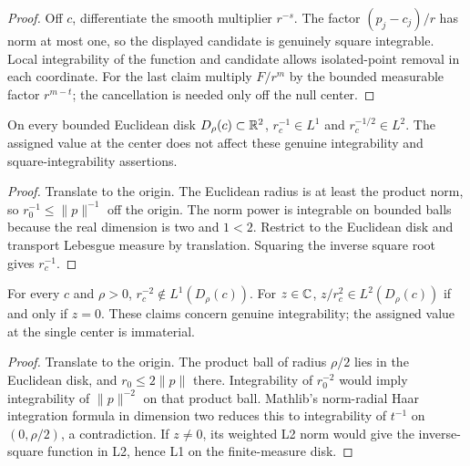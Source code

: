 \begin{proof}
\leanok
Off $c$, differentiate the smooth multiplier $r^{-s}$.
The factor $(p_j-c_j)/r$ has norm at most one, so the displayed candidate
is genuinely square integrable. Local integrability of the function and
candidate allows isolated-point removal in each coordinate.
For the last claim multiply $F/r^m$ by the bounded measurable factor
$r^{m-t}$; the cancellation is needed only off the null center.
\end{proof}

\begin{lemma}
\label{lem:inverse-radius-mass}
\leanok
On every bounded Euclidean disk $D_\rho(c)\subset\mathbb{R}^2$,
$r_c^{-1}\in L^1$ and $r_c^{-1/2}\in L^2$.
The assigned value at the center does not affect these genuine integrability
and square-integrability assertions.
\end{lemma}

\begin{proof}
\leanok
Translate to the origin. The Euclidean radius is at least the product
norm, so $r_0^{-1}\le\|p\|^{-1}$ off the origin.
The norm power is integrable on bounded balls because the real dimension
is two and $1<2$. Restrict to the Euclidean disk and transport Lebesgue
measure by translation. Squaring the inverse square root gives $r_c^{-1}$.
\end{proof}

\begin{lemma}
\label{lem:inverse-square-nonintegrability}
\leanok
For every $c$ and $\rho>0$, $r_c^{-2}\notin L^1(D_\rho(c))$.
For $z\in\mathbb{C}$, $z/r_c^2\in L^2(D_\rho(c))$ if and only if $z=0$.
These claims concern genuine integrability; the assigned value at the
single center is immaterial.
\end{lemma}

\begin{proof}
\leanok
Translate to the origin. The product ball of radius $\rho/2$ lies in the
Euclidean disk, and $r_0\le2\|p\|$ there. Integrability of $r_0^{-2}$
would imply integrability of $\|p\|^{-2}$ on that product ball.
Mathlib's norm-radial Haar integration formula in dimension two reduces
this to integrability of $t^{-1}$ on $(0,\rho/2)$, a contradiction.
If $z\ne0$, its weighted L2 norm would give the inverse-square function
in L2, hence L1 on the finite-measure disk.
\end{proof}

